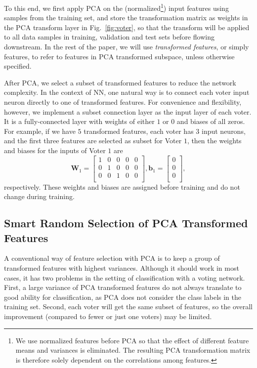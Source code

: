 \documentclass[10pt, final, letter, twocolumns]{IEEEtran}
\begin{document}
To this end, we first apply PCA on the (normalized\footnote{We use normalized features before PCA so that the effect of different feature means and variances is eliminated. The resulting PCA transformation matrix is therefore solely dependent on the correlations among features.}) input features using samples from the training set, and store the transformation matrix as weights in the PCA transform layer in Fig.~\ref{fig:voter}, so that the transform will be applied to all data samples in training, validation and test sets before flowing downstream. In the rest of the paper, we will use \emph{transformed features}, or simply features, to refer to features in PCA transformed subspace, unless otherwise specified.

After PCA, we select a subset of transformed features to reduce the network complexity. In the context of NN, one natural way is to connect each voter input neuron directly to one of transformed features. For convenience and flexibility, however, we implement a subset connection layer as the input layer of each voter. It is a fully-connected layer with weights of either $1$ or $0$ and biases of all zeros. For example, if we have $5$ transformed features, each voter has $3$ input neurons, and the first three features are selected as subset for Voter $1$, then the weights and biases for the inputs of Voter $1$ are
$$\mathbf{W}_1=\left[\begin{matrix}
 1 & 0 & 0 & 0 & 0 \\
 0 & 1 & 0 & 0 & 0 \\
 0 & 0 & 1 & 0 & 0 \\
 \end{matrix}\right], \mathbf{b}_1 = \left[\begin{matrix}
 0 \\
 0 \\
 0 \\
 \end{matrix}\right],$$
respectively. These weights and biases are assigned before training and do not change during training.
\subsection{Smart Random Selection of PCA Transformed Features}\vspace{-1mm}
\label{subsec:smartPC}
A conventional way of feature selection with PCA is to keep a group of transformed features with highest variances. Although it should work in most cases, it has two problems in the setting of classification with a voting network. First, a large variance of PCA transformed features do not always translate to good ability for classification, as PCA does not consider the class labels in the training set. Second, each voter will get the same subset of features, so the overall  improvement (compared to fewer or just one voters) may be limited.
\end{document}
